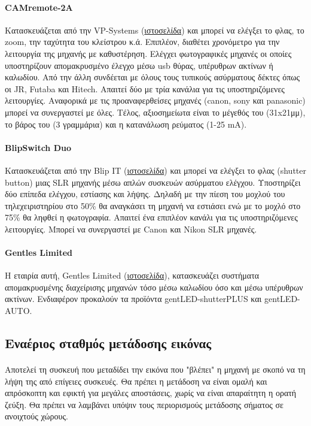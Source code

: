 \documentclass[a4paper, 12pt, twoside]{report}
\begin{document}
{{{{{{			\paragraph{CAMremote-2A}{Κατασκευάζεται από την VP-Systems (\href{http://vp-systems.eu/camremote.html}{ιστοσελίδα}) και μπορεί να ελέγξει το φλας, το zoom, την ταχύτητα του κλείστρου κ.ά. Επιπλέον, διαθέτει χρονόμετρο για την λειτουργία της μηχανής με καθυστέρηση. Ελέγχει φωτογραφικές μηχανές οι οποίες υποστηρίζουν απομακρυσμένο έλεγχο μέσω usb θύρας, υπέρυθρων ακτίνων ή καλωδίου. Από την άλλη συνδέεται με όλους τους τυπικούς ασύρματους δέκτες όπως οι JR, Futaba και Hitech. Απαιτεί δύο με τρία κανάλια για τις υποστηριζόμενες λειτουργίες. Αναφορικά με τις προαναφερθείσες μηχανές (canon, sony και panasonic) μπορεί να συνεργαστεί με όλες. Τέλος, αξιοσημείωτα είναι το μέγεθός του (31x21μμ), το βάρος του (3 γραμμάρια) και η κατανάλωση ρεύματος (1-25 mA).
			}
			\paragraph{BlipSwitch Duo}{Κατασκευάζεται από την Blip IT (\href{http://blip.com.au}{ιστοσελίδα}) και μπορεί να ελέγξει το φλας (shutter button) μιας SLR μηχανής μέσω απλών συσκευών ασύρματου ελέγχου. Υποστηρίζει δύο επίπεδα ελέγχου, εστίασης και λήψης. Δηλαδή με την πίεση του μοχλού του τηλεχειριστηρίου στο 50\% θα αναγκάσει τη μηχανή να εστιάσει ενώ με το μοχλό στο 75\% θα ληφθεί η φωτογραφία. Απαιτεί ένα επιπλέον κανάλι για τις υποστηριζόμενες λειτουργίες. Μπορεί να συνεργαστεί με Canon και Nikon SLR μηχανές.
			}
			\paragraph{Gentles Limited}{Η εταιρία αυτή, Gentles Limited (\href{http://www.gentles.ltd.uk/}{ιστοσελίδα}), κατασκευάζει συστήματα απομακρυσμένης διαχείρισης μηχανών τόσο μέσω καλωδίου όσο και μέσω υπέρυθρων ακτίνων. Ενδιαφέρον προκαλούν τα προϊόντα gentLED-shutterPLUS και gentLED-AUTO.
			}
		
		\subsection{Εναέριος σταθμός μετάδοσης εικόνας}	
			\paragraph{}{Αποτελεί τη συσκευή που μεταδίδει την εικόνα που "βλέπει" η μηχανή με σκοπό να τη λήψη της από επίγειες συσκευές. Θα πρέπει η μετάδοση να είναι ομαλή και απρόσκοπτη και εφικτή για μεγάλες αποστάσεις, χωρίς να είναι απαραίτητη η ορατή ζεύξη. Θα πρέπει να λαμβάνει υπόψιν τους περιορισμούς μετάδοσης σήματος σε ανοιχτούς χώρους.
			}
		
}}}}}}
\end{document}
